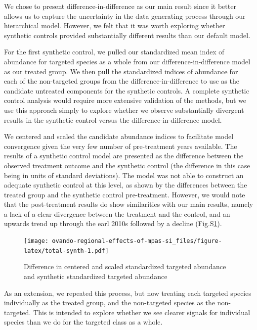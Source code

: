 \documentclass[]{article}
\begin{document}
We chose to present difference-in-difference as our main result since it better allows us to capture the uncertainty in the data generating process through our hierarchical model. However, we felt that it was worth exploring whether synthetic controls provided substantially different results than our default model.

For the first synthetic control, we pulled our standardized mean index of abundance for targeted species as a whole from our difference-in-difference model as our treated group. We then pull the standardized indices of abundance for each of the non-targeted groups from the difference-in-difference to use as the candidate untreated components for the synthetic controls. A complete synthetic control analysis would require more extensive validation of the methods, but we use this approach simply to explore whether we observe substantially divergent results in the synthetic control versus the difference-in-difference model.

We centered and scaled the candidate abundance indices to facilitate model convergence given the very few number of pre-treatment years available. The results of a synthetic control model are presented as the difference between the observed treatment outcome and the synthetic control (the difference in this case being in units of standard deviations). The model was not able to construct an adequate synthetic control at this level, as shown by the differences between the treated group and the synthetic control pre-treatment. However, we would note that the post-treatment results do show similarities with our main results, namely a lack of a clear divergence between the treatment and the control, and an upwards trend up through the earl 2010s followed by a decline (Fig.S\ref{fig:total-synth}).

\begin{figure}
\centering
\texttt{[image: ovando-regional-effects-of-mpas-si\_files/figure-latex/total-synth-1.pdf]}
\caption{\label{fig:total-synth}Difference in centered and scaled standardized targeted abundance and synthetic standardized targeted abundance}
\end{figure}

As an extension, we repeated this process, but now treating each targeted species individually as the treated group, and the non-targeted species as the non-targeted. This is intended to explore whether we see clearer signals for individual species than we do for the targeted class as a whole.
\end{document}
